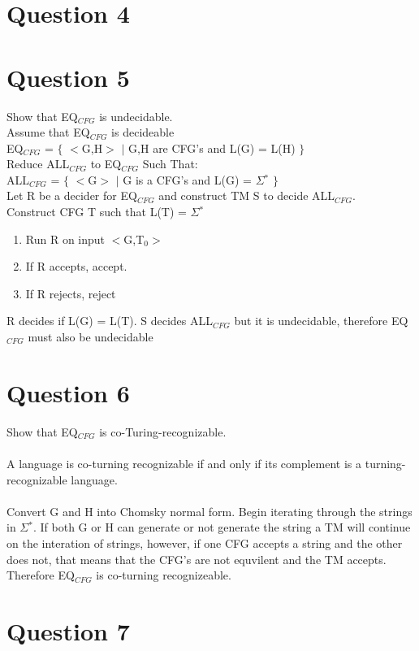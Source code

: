 \documentclass[10pt,a4paper]{article}
\begin{document}
\section*{Question 4}

\section*{Question 5}
Show that EQ$_{CFG}$ is undecidable.\\
Assume that EQ$_{CFG}$ is decideable\\
EQ$_{CFG}$ = $\lbrace$ $<$G,H$>$ $\mid$ G,H are CFG's and L(G) = L(H) $\rbrace$
\\
Reduce ALL$_{CFG}$ to EQ$_{CFG}$ Such That:
\\
ALL$_{CFG}$ = $\lbrace$ $<$G$>$ $\mid$ G is a CFG's and L(G) = $\Sigma$$^{\ast}$ $\rbrace$
\\
Let R be a decider for EQ$_{CFG}$ and construct TM S to decide ALL$_{CFG}$.
\\
Construct CFG T such that L(T) = $\Sigma$$^{\ast}$
\begin{enumerate}
  \item Run R on input $<$G,T$_{0}$$>$
  \item If R accepts, accept.
  \item If R rejects, reject 
\end{enumerate}
R decides if L(G) = L(T). S decides ALL$_{CFG}$ but it is undecidable, therefore EQ$_{CFG}$ must also be undecidable 

\section*{Question 6}
Show that EQ$_{CFG}$ is co-Turing-recognizable.\\\\
A language is co-turning recognizable if and only if its complement is a turning-recognizable language.\\
\\
Convert G and H into Chomsky normal form. Begin iterating through the strings in $\Sigma$$^{\ast}$. If both G or H can generate or not generate the string a TM will continue on the interation of strings, however, if one CFG accepts a string and the other does not, that means that the CFG's are not equvilent and the TM accepts. Therefore EQ$_{CFG}$  is co-turning recognizeable.
\section*{Question 7}
\end{document}
